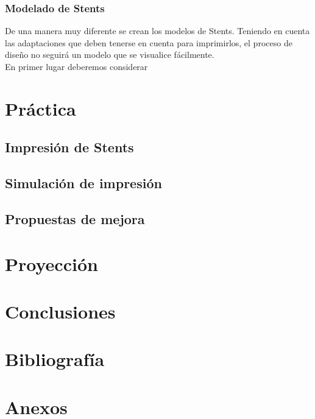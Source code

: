 \documentclass[a4paper,12pt]{article}
\begin{document}
\subsubsection{Modelado de Stents}
De una manera muy diferente se crean los modelos de Stents. Teniendo en cuenta las adaptaciones que deben tenerse en cuenta para imprimirlos, el proceso de diseño no seguirá un modelo que se visualice fácilmente.\\

En primer lugar deberemos considerar 




\pagebreak
\section{Práctica}
\subsection{Impresión de Stents}
\subsection{Simulación de impresión}
\subsection{Propuestas de mejora}



\pagebreak
\section{Proyección}

\pagebreak
\section{Conclusiones}


\pagebreak
\section{Bibliografía}


\pagebreak
\section{Anexos}
\end{document}
